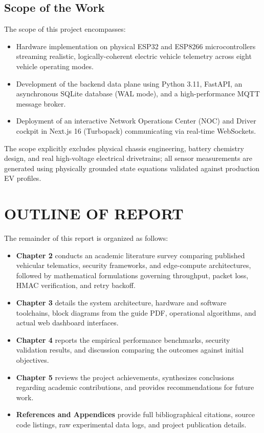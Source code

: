 \documentclass[12pt,a4paper]{report}
\begin{document}
\subsection{Scope of the Work}
The scope of this project encompasses:
\begin{itemize}[leftmargin=1.2cm, itemsep=0.3em]
    \item Hardware implementation on physical ESP32 and ESP8266 microcontrollers streaming realistic, logically-coherent electric vehicle telemetry across eight vehicle operating modes.
    \item Development of the backend data plane using Python 3.11, FastAPI, an asynchronous SQLite database (WAL mode), and a high-performance MQTT message broker.
    \item Deployment of an interactive Network Operations Center (NOC) and Driver cockpit in Next.js 16 (Turbopack) communicating via real-time WebSockets.
\end{itemize}
The scope explicitly excludes physical chassis engineering, battery chemistry design, and real high-voltage electrical drivetrains; all sensor measurements are generated using physically grounded state equations validated against production EV profiles.

\section{OUTLINE OF REPORT}
The remainder of this report is organized as follows:
\begin{itemize}[leftmargin=1.2cm, itemsep=0.3em]
    \item \textbf{Chapter 2} conducts an academic literature survey comparing published vehicular telematics, security frameworks, and edge-compute architectures, followed by mathematical formulations governing throughput, packet loss, HMAC verification, and retry backoff.
    \item \textbf{Chapter 3} details the system architecture, hardware and software toolchains, block diagrams from the guide PDF, operational algorithms, and actual web dashboard interfaces.
    \item \textbf{Chapter 4} reports the empirical performance benchmarks, security validation results, and discussion comparing the outcomes against initial objectives.
    \item \textbf{Chapter 5} reviews the project achievements, synthesizes conclusions regarding academic contributions, and provides recommendations for future work.
    \item \textbf{References and Appendices} provide full bibliographical citations, source code listings, raw experimental data logs, and project publication details.
\end{itemize}
\end{document}
